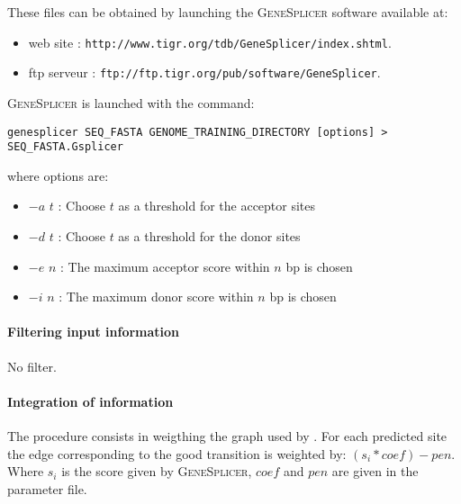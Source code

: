These files can be obtained by launching the \textsc{GeneSplicer} software
available at:
\begin{itemize}
\item  web site : \texttt{http://www.tigr.org/tdb/GeneSplicer/index.shtml}.
\item  ftp serveur : \texttt{ftp://ftp.tigr.org/pub/software/GeneSplicer}.
\end{itemize}

\textsc{GeneSplicer} is launched with the command:
\begin{Verbatim}[fontsize=\small]
genesplicer SEQ_FASTA GENOME_TRAINING_DIRECTORY [options] > SEQ_FASTA.Gsplicer
\end{Verbatim}
where options are:
\begin{itemize}
\item $-a$ $t$ : Choose $t$ as a threshold for the acceptor sites
\item $-d$ $t$ : Choose $t$ as a threshold for the donor sites
\item $-e$ $n$ : The maximum acceptor score within $n$ bp is chosen
\item $-i$ $n$ : The maximum donor score within $n$ bp is chosen
\end{itemize}

\paragraph{Filtering input information}

No filter.

\paragraph{Integration of information}

The procedure consists in weigthing the graph used by \EuGenie. For
each predicted site the edge corresponding to the good transition is
weighted by: $(s_i * coef) - pen$.  Where $s_i$ is the score given by
\textsc{GeneSplicer}, $coef$ and $pen$ are given in the parameter
file.

